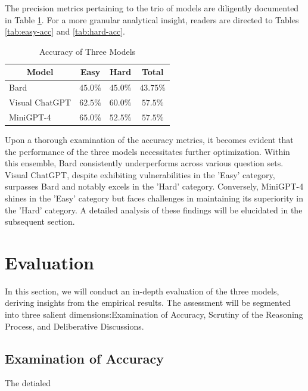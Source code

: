 \documentclass[journal,10pt]{IEEEtran}
\begin{document}
The precision metrics pertaining to the trio of models are diligently documented in Table \ref{tab:accuracy}. For a more granular analytical insight, readers are directed to Tables \ref{tab:easy-acc} and \ref{tab:hard-acc}.
\begin{table}[h]
    \centering
    \caption{Accuracy of Three Models}
    \label{tab:accuracy}
    \begin{tabular}{@{}lccc@{}}
    \toprule
    \multicolumn{1}{c}{Model} & Easy      & Hard & Total \\ \midrule
    Bard                      &  $45.0\%$ & $45.0\%$ &  $43.75\%$ \\
    Visual ChatGPT            &  $62.5\%$ & $60.0\%$ &  $57.5\%$  \\
    MiniGPT-4                 &  $65.0\%$ & $52.5\%$ &  $57.5\%$  \\ \bottomrule
    \end{tabular}
\end{table}

Upon a thorough examination of the accuracy metrics, it becomes evident that the performance of the three models necessitates further optimization. Within this ensemble, Bard consistently underperforms across various question sets. Visual ChatGPT, despite exhibiting vulnerabilities in the 'Easy' category, surpasses Bard and notably excels in the 'Hard' category. Conversely, MiniGPT-4 shines in the 'Easy' category but faces challenges in maintaining its superiority in the 'Hard' category. A detailed analysis of these findings will be elucidated in the subsequent section.

\section{Evaluation}
In this section, we will conduct an in-depth evaluation of the three models, deriving insights from the empirical results. The assessment will be segmented into three salient dimensions:Examination of Accuracy, Scrutiny of the Reasoning Process, and Deliberative Discussions.
\subsection{Examination of Accuracy}
The detialed 
\end{document}
